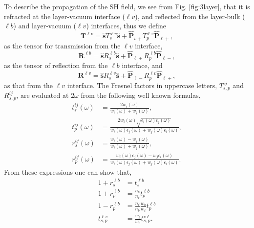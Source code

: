 To describe the propagation of the SH field, we see from Fig. \ref{fig:3layer},
that it is refracted at the layer-vacuum interface ($\ell v$), and  reflected
from the layer-bulk ($\ell b$) and layer-vacuum ($\ell v$) interfaces, thus we
define
\begin{equation}\label{r5}
\mathbf{T}^{\ell v}
= \hat{\mathbf{s}}T_{s}^{\ell v}\hat{\mathbf{s}} 
+ \hat{\mathbf{P}}_{v+}T_{p}^{\ell v}\hat{\mathbf{P}}_{\ell +},
\end{equation}
as the tensor for transmission from the $\ell v$ interface,
\begin{equation}\label{r6}
\mathbf{R}^{\ell b}
= \hat{\mathbf{s}}R_{s}^{\ell b}\hat{\mathbf{s}}
+ \hat{\mathbf{P}}_{\ell +}R_{p}^{\ell b}\hat{\mathbf{P}}_{\ell -},
\end{equation} 
as the tensor of reflection from the $\ell b$ interface, and
\begin{equation}\label{r6b}
\mathbf{R}^{\ell v}
= \hat{\mathbf{s}}R_{s}^{\ell v}\hat{\mathbf{s}}
+ \hat{\mathbf{P}}_{\ell -}R_{p}^{\ell v}\hat{\mathbf{P}}_{\ell +},
\end{equation} 
as that from the $\ell v$ interface. The Fresnel factors in uppercase letters,
$T^{ij}_{s,p}$ and $R^{ij}_{s,p}$, are evaluated at $2\omega$ from the following
well known formulas,\cite{ mizrahiJOSA88}
\begin{align}
t_s^{ij}(\omega) &=
\frac{2w_{i}(\omega)}{w_{i}(\omega)+w_{j}(\omega)},\\
t_{p}^{ij}(\omega) &=
\frac{2w_{i}(\omega)\sqrt{\epsilon_{i}(\omega)\epsilon_j(\omega)}}
     {w_{i}(\omega)\epsilon_{j}(\omega)+w_{j}(\omega)\epsilon_{i}(\omega)},\\
r_s^{ij}(\omega) &=
\frac{w_{i}(\omega) - w_{j}(\omega)}
     {w_{i}(\omega) + w_{j}(\omega)},\\
r_{p}^{ij}(\omega) &=
\frac{w_{i}(\omega)\epsilon_{j}(\omega) - w_{j}\epsilon_{i}(\omega)}
     {w_{i}(\omega)\epsilon_{j}(\omega) + w_{j}(\omega)\epsilon_{i}(\omega)}. 
\end{align}
From these expressions one can show that,
\begin{align}\label{mf}
1 + r^{\ell b}_{s} &= t^{\ell b}_{s}\nonumber\\
1 + r^{\ell b}_{p}
&= \frac{n_b}{n_\ell} 
t^{\ell b}_{p} 
\nonumber\\ 
1 - r^{\ell b}_{p}
&= \frac{n_\ell}{n_b}
   \frac{w_{b}}{w_{\ell}}t^{\ell b}_{p}\\ 
t^{\ell v}_{s,p} &= \frac{w_{\ell}}{w_{v}}t^{v\ell}_{s,p}\nonumber
.
\end{align}


